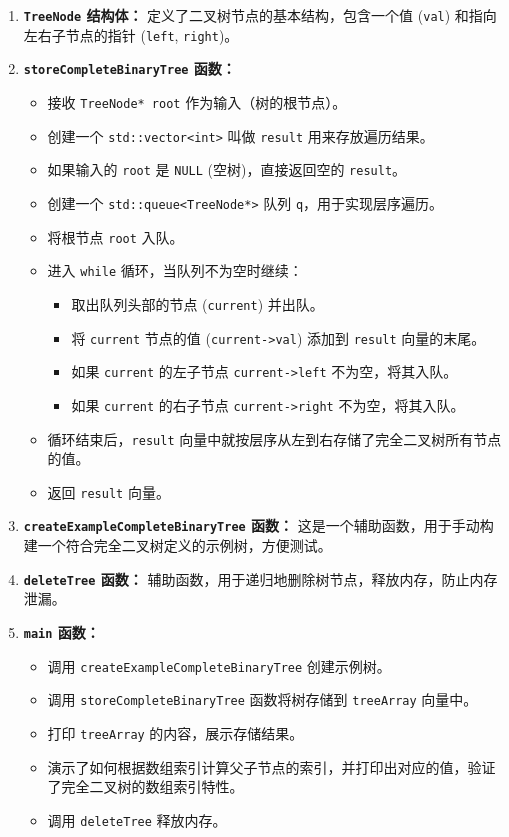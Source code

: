 \begin{enumerate}
	\item \textbf{\lstinline{TreeNode} 结构体：} 定义了二叉树节点的基本结构，包含一个值 (\lstinline{val}) 和指向左右子节点的指针 (\lstinline{left}, \lstinline{right})。
	\item \textbf{\lstinline{storeCompleteBinaryTree} 函数：}
	\begin{itemize}
		\item 接收 \lstinline{TreeNode* root} 作为输入（树的根节点）。
		\item 创建一个 \lstinline{std::vector<int>} 叫做 \lstinline{result} 用来存放遍历结果。
		\item 如果输入的 \lstinline{root} 是 \lstinline{NULL} (空树)，直接返回空的 \lstinline{result}。
		\item 创建一个 \lstinline{std::queue<TreeNode*>} 队列 \lstinline{q}，用于实现层序遍历。
		\item 将根节点 \lstinline{root} 入队。
		\item 进入 \lstinline{while} 循环，当队列不为空时继续：
		\begin{itemize}
			\item 取出队列头部的节点 (\lstinline{current}) 并出队。
			\item 将 \lstinline{current} 节点的值 (\lstinline{current->val}) 添加到 \lstinline{result} 向量的末尾。
			\item 如果 \lstinline{current} 的左子节点 \lstinline{current->left} 不为空，将其入队。
			\item 如果 \lstinline{current} 的右子节点 \lstinline{current->right} 不为空，将其入队。
		\end{itemize}
		\item 循环结束后，\lstinline{result} 向量中就按层序从左到右存储了完全二叉树所有节点的值。
		\item 返回 \lstinline{result} 向量。
	\end{itemize}
	\item \textbf{\lstinline{createExampleCompleteBinaryTree} 函数：} 这是一个辅助函数，用于手动构建一个符合完全二叉树定义的示例树，方便测试。
	\item \textbf{\lstinline{deleteTree} 函数：} 辅助函数，用于递归地删除树节点，释放内存，防止内存泄漏。
	\item \textbf{\lstinline{main} 函数：}
	\begin{itemize}
		\item 调用 \lstinline{createExampleCompleteBinaryTree} 创建示例树。
		\item 调用 \lstinline{storeCompleteBinaryTree} 函数将树存储到 \lstinline{treeArray} 向量中。
		\item 打印 \lstinline{treeArray} 的内容，展示存储结果。
		\item 演示了如何根据数组索引计算父子节点的索引，并打印出对应的值，验证了完全二叉树的数组索引特性。
		\item 调用 \lstinline{deleteTree} 释放内存。
	\end{itemize}
\end{enumerate}


